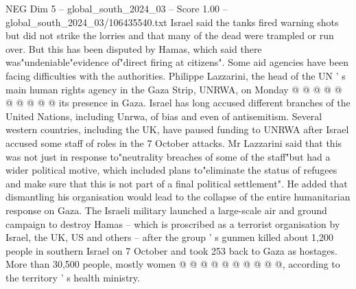 \begin{textsample}{NEG Dim 5 – global\_south\_2024\_03 – Score 1.00 – global\_south\_2024\_03/106435540.txt}
Israel said the tanks fired warning shots but did not strike the lorries and that many of the dead were trampled or run over.
But this has been disputed by Hamas, which said there was"undeniable"evidence of"direct firing at citizens".
Some aid agencies have been facing difficulties with the authorities.
Philippe Lazzarini, the head of the UN ' s main human rights agency in the Gaza Strip, UNRWA, on Monday @ @ @ @ @ @ @ @ @ @ its presence in Gaza.
Israel has long accused different branches of the United Nations, including Unrwa, of bias and even of antisemitism.
Several western countries, including the UK, have paused funding to UNRWA after Israel accused some staff of roles in the 7 October attacks.
Mr Lazzarini said that this was not just in response to"neutrality breaches of some of the staff"but had a wider political motive, which included plans to"eliminate the status of refugees and make sure that this is not part of a final political settlement".
He added that dismantling his organisation would lead to the collapse of the entire humanitarian response on Gaza.
The Israeli military launched a large-scale air and ground campaign to destroy Hamas -- which is proscribed as a terrorist organisation by Israel, the UK, US and others -- after the group ' s gunmen killed about 1,200 people in southern Israel on 7 October and took 253 back to Gaza as hostages.
More than 30,500 people, mostly women @ @ @ @ @ @ @ @ @ @, according to the territory ' s health ministry.

\end{textsample}

